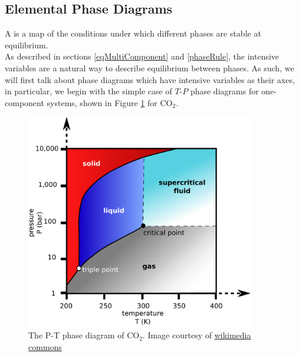 \documentclass[12pt]{article}
\begin{document}
\subsection{Elemental Phase Diagrams} \label{elementalPhaseDiagrams}

A  is a map of the conditions under which different phases are stable at equilibrium.\\
As described in sections \ref{eqMultiComponent} and \ref{phaseRule}, the intensive variables are a natural way to describe equilibrium between phases. As such, we will first talk about phase diagrams which have intensive variables as their axes, in particular, we begin with the simple case of $T$-$P$ phase diagrams for one-component systems, shown in Figure \ref{phaseDiagramCO2} for $\text{CO}_2$. 
%   
\begin{figure}[h]
\centering
\includegraphics[width=10cm]{Carbon_dioxide_pressure_temperature_phase_diagram2.pdf}
\caption{The P-T phase diagram of $\text{CO}_2$. Image courtesy of \href{https://commons.wikimedia.org/wiki/File:Carbon_dioxide_pressure-temperature_phase_diagram.svg}{wikimedia commons}}%
\label{phaseDiagramCO2}
\end{figure}
\end{document}

